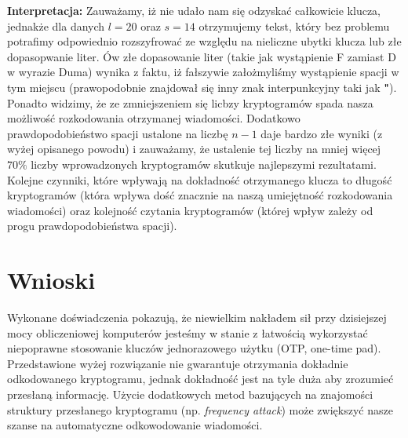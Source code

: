 \documentclass[a4paper,14pt]{report}
\begin{document}
    \textbf{Interpretacja: } Zauważamy, iż nie udało nam się odzyskać całkowicie klucza, jednakże dla danych $l=20$ oraz $s=14$ otrzymujemy tekst, który bez problemu potrafimy odpowiednio rozszyfrować ze względu na nieliczne ubytki klucza lub złe dopasopwanie liter. Ów złe dopasowanie liter (takie jak wystąpienie F zamiast D w wyrazie Duma) wynika z faktu, iż fałszywie założmyliśmy wystąpienie spacji w tym miejscu (prawopodobnie znajdował się inny znak interpunkcyjny taki jak \textbf{"}). \\
    Ponadto widzimy, że ze zmniejszeniem się licbzy kryptogramów spada nasza możliwość rozkodowania otrzymanej wiadomości. Dodatkowo prawdopodobieństwo spacji ustalone na liczbę $n-1$ daje bardzo złe wyniki (z wyżej opisanego powodu) i zauważamy, że ustalenie tej liczby na mniej więcej $70\%$ liczby wprowadzonych kryptogramów skutkuje najlepszymi rezultatami. \\
    Kolejne czynniki, które wpływają na dokładność otrzymanego klucza to długość kryptogramów (która wpływa dość znacznie na naszą umiejętność rozkodowania wiadomości) oraz kolejność czytania kryptogramów (której wpływ zależy od progu prawdopodobieństwa spacji).
\section{Wnioski}
	Wykonane doświadczenia pokazują, że niewielkim nakładem sił przy dzisiejszej mocy obliczeniowej komputerów jesteśmy w stanie z łatwością wykorzystać niepoprawne stosowanie kluczów jednorazowego użytku (OTP, one-time pad). Przedstawione wyżej rozwiązanie nie gwarantuje otrzymania dokładnie odkodowanego kryptogramu, jednak dokładność jest na tyle duża aby zrozumieć przesłaną informację. Użycie dodatkowych metod bazujących na znajomości struktury przesłanego kryptogramu (np. \textit{frequency attack}) może zwiększyć nasze szanse na automatyczne odkowodowanie wiadomości.
\end{document}
